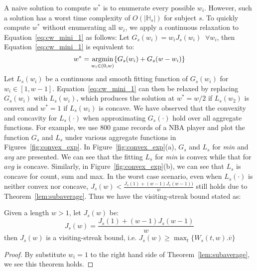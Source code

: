 A naive solution to compute $w^*$ is to enumerate every possible $w_i$.
However, such a solution has a worst time complexity of $O(|\mathbb{H}_s|)$ for subject $s$. 
To quickly compute $w^*$ without enumerating all $w_i$,
we apply a continuous relaxation to Equation~\ref{eq:cw_mini_1} as follows: 
Let $G_s(w_i) = w_iJ_s(w_i) \;\;\forall w_i$, 
then Equation~\ref{eq:cw_mini_1} is equivalent to:
\begin{equation}
\label{eq:cw_mini_2}
w^*  = \operatorname*{argmin}_{w_i\in(0,w)} \{G_s(w_i) + G_s(w-w_i)\}
\end{equation}
Let $L_s(w_i)$ be a continuous and smooth fitting function 
of $G_s(w_i)$ for $w_i \in [1,w-1]$.  Equation~\ref{eq:cw_mini_1} can then be relaxed by replacing $G_s(w_i)$ with $L_s(w_i)$,
which produces
the solution at $w^*=w/2$ if $L_s(w_2)$ is convex and $w^*=1$ 
if $L_s(w_i)$ is concave. We have observed that the convexity and concavity for $L_s(\cdot)$
when approximating $G_s(\cdot)$ hold over all aggregate functions. %
For example, we use 800 game records of a NBA player and plot the 
function $G_s$ and $L_s$ under various aggregate functions in Figures~\ref{fig:convex_exp}. 
In Figure~\ref{fig:convex_exp}(a), $G_s$ and $L_s$ for \emph{min} and \emph{avg} are presented. 
We can see that the fitting $L_s$ for \emph{min} is convex while that for $avg$ is concave.
Similarly, in Figure~\ref{fig:convex_exp}(b), 
we can see that $L_s$ is concave for count, sum and max. 
In the worst case scenario, even when $L_s(\cdot)$ is neither convex nor concave, 
$J_s(w) < \frac{J_s(1) + (w-1)J_s(w - 1))}{w}$ still holds due to 
Theorem~\ref{lem:subaverage}. Thus we have the visiting-streak bound stated as:

\begin{theorem}
\label{thm:visiting_window_bound}
Given a length $w > 1$, let $J_s(w)$ be:
\begin{equation}
J_s(w) = \frac{J_s(1) + (w-1)J_s(w-1)}{w}
\end{equation}
then $J_s(w)$ is a visiting-streak bound, i.e. $ J_s(w) \geq  \max_t\{W_s(t,w).\overline{v}\}$
\end{theorem}
\begin{proof}
By substitute $w_i = 1$ to the right hand side of Theorem~\ref{lem:subaverage}, we see this theorem holds. 
\end{proof}

